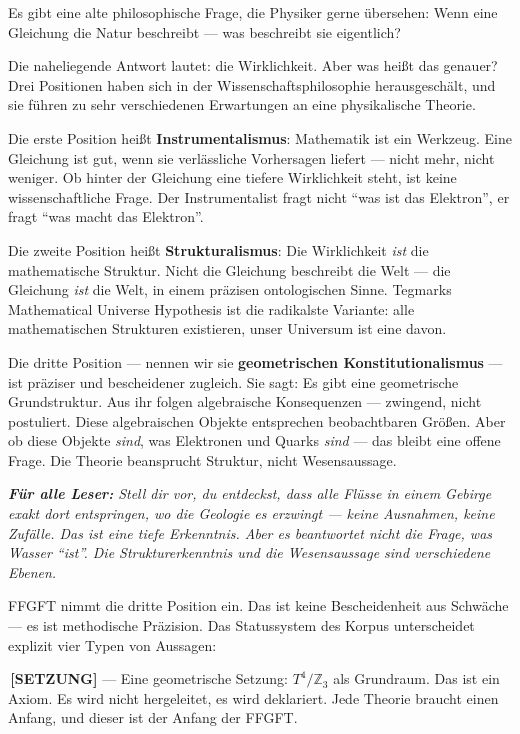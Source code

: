 \documentclass[11pt,oneside]{book}
\newcommand{\status}[1]{\penalty10000\,{\scriptsize\textcolor{gray!60}{[#1]}}}
\newenvironment{laierspur}{%
  \par\vspace{4pt}%
  \noindent\small\itshape\color{blue!60!black}%
  \textbf{Für alle Leser:}\enspace\ignorespaces}{%
  \par\vspace{4pt}\normalsize\normalfont\normalcolor}
\begin{document}
Es gibt eine alte philosophische Frage, die Physiker gerne übersehen: Wenn
eine Gleichung die Natur beschreibt — was beschreibt sie eigentlich?


Die naheliegende Antwort lautet: die Wirklichkeit. Aber was heißt das
genauer? Drei Positionen haben sich in der Wissenschaftsphilosophie
herausgeschält, und sie führen zu sehr verschiedenen Erwartungen an eine
physikalische Theorie.


Die erste Position heißt \textbf{Instrumentalismus}: Mathematik ist ein Werkzeug.
Eine Gleichung ist gut, wenn sie verlässliche Vorhersagen liefert — nicht
mehr, nicht weniger. Ob hinter der Gleichung eine tiefere Wirklichkeit
steht, ist keine wissenschaftliche Frage. Der Instrumentalist fragt nicht
\enquote{was ist das Elektron}, er fragt \enquote{was macht das Elektron}.


Die zweite Position heißt \textbf{Strukturalismus}: Die Wirklichkeit \textit{ist} die
mathematische Struktur. Nicht die Gleichung beschreibt die Welt — die
Gleichung \textit{ist} die Welt, in einem präzisen ontologischen Sinne. Tegmarks
Mathematical Universe Hypothesis ist die radikalste Variante: alle
mathematischen Strukturen existieren, unser Universum ist eine davon.


Die dritte Position — nennen wir sie \textbf{geometrischen Konstitutionalismus} —
ist präziser und bescheidener zugleich. Sie sagt: Es gibt eine geometrische
Grundstruktur. Aus ihr folgen algebraische Konsequenzen — zwingend, nicht
postuliert. Diese algebraischen Objekte entsprechen beobachtbaren Größen.
Aber ob diese Objekte \textit{sind}, was Elektronen und Quarks \textit{sind} — das bleibt
eine offene Frage. Die Theorie beansprucht Struktur, nicht Wesensaussage.


\begin{laierspur}
Stell dir vor, du entdeckst, dass alle Flüsse in einem
Gebirge exakt dort entspringen, wo die Geologie es erzwingt — keine
Ausnahmen, keine Zufälle. Das ist eine tiefe Erkenntnis. Aber es
beantwortet nicht die Frage, was Wasser \enquote{ist}. Die Strukturerkenntnis
und die Wesensaussage sind verschiedene Ebenen.
\end{laierspur}

FFGFT nimmt die dritte Position ein. Das ist keine Bescheidenheit aus
Schwäche — es ist methodische Präzision. Das Statussystem des Korpus
unterscheidet explizit vier Typen von Aussagen:


\textbf{\status{SETZUNG}} — Eine geometrische Setzung: $T^4/\mathbb{Z}_3$ als Grundraum. Das ist
ein Axiom. Es wird nicht hergeleitet, es wird deklariert. Jede Theorie
braucht einen Anfang, und dieser ist der Anfang der FFGFT.
\end{document}
